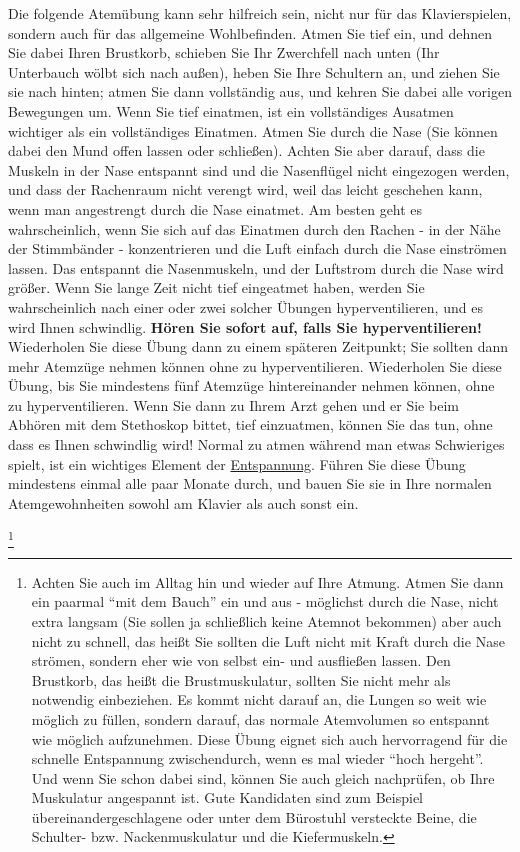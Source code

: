 Die folgende Atemübung kann sehr hilfreich sein, nicht nur für das Klavierspielen, sondern auch für das allgemeine Wohlbefinden.
Atmen Sie tief ein, und dehnen Sie dabei Ihren Brustkorb, schieben Sie Ihr Zwerchfell nach unten (Ihr Unterbauch wölbt sich nach außen), heben Sie Ihre Schultern an, und ziehen Sie sie nach hinten; atmen Sie dann vollständig aus, und kehren Sie dabei alle vorigen Bewegungen um.
Wenn Sie tief einatmen, ist ein vollständiges Ausatmen wichtiger als ein vollständiges Einatmen.
Atmen Sie durch die Nase (Sie können dabei den Mund offen lassen oder schließen). Achten Sie aber darauf, dass die Muskeln in der Nase entspannt sind und die Nasenflügel nicht eingezogen werden, und dass der Rachenraum nicht verengt wird, weil das leicht geschehen kann, wenn man angestrengt durch die Nase einatmet. Am besten geht es wahrscheinlich, wenn Sie sich auf das Einatmen durch den Rachen - in der Nähe der Stimmbänder - konzentrieren und die Luft einfach durch die Nase einströmen lassen. Das entspannt die Nasenmuskeln, und der Luftstrom durch die Nase wird größer.
Wenn Sie lange Zeit nicht tief eingeatmet haben, werden Sie wahrscheinlich nach einer oder zwei solcher Übungen hyperventilieren, und es wird Ihnen schwindlig. \textbf{Hören Sie sofort auf, falls Sie hyperventilieren!}
Wiederholen Sie diese Übung dann zu einem späteren Zeitpunkt; Sie sollten dann mehr Atemzüge nehmen können ohne zu hyperventilieren.
Wiederholen Sie diese Übung, bis Sie mindestens fünf Atemzüge hintereinander nehmen können, ohne zu hyperventilieren.
Wenn Sie dann zu Ihrem Arzt gehen und er Sie beim Abhören mit dem Stethoskop bittet, tief einzuatmen, können Sie das tun, ohne dass es Ihnen schwindlig wird!
Normal zu atmen während man etwas Schwieriges spielt, ist ein wichtiges Element der \hyperlink{c1ii14}{Entspannung}.
Führen Sie diese Übung mindestens einmal alle paar Monate durch, und bauen Sie sie in Ihre normalen Atemgewohnheiten sowohl am Klavier als auch sonst ein.

\hypertarget{c1ii21uebung}{}\footnote{Achten Sie auch im Alltag hin und wieder auf Ihre Atmung. Atmen Sie dann ein paarmal \enquote{mit dem Bauch} ein und aus - möglichst durch die Nase, nicht extra langsam (Sie sollen ja schließlich keine Atemnot bekommen) aber auch nicht zu schnell, das heißt Sie sollten die Luft nicht mit Kraft durch die Nase strömen, sondern eher wie von selbst ein- und ausfließen lassen. Den Brustkorb, das heißt die Brustmuskulatur, sollten Sie nicht mehr als notwendig einbeziehen. Es kommt nicht darauf an, die Lungen so weit wie möglich zu füllen, sondern darauf, das normale Atemvolumen so entspannt wie möglich aufzunehmen. Diese Übung eignet sich auch hervorragend für die schnelle Entspannung zwischendurch, wenn es mal wieder \enquote{hoch hergeht}. Und wenn Sie schon dabei sind, können Sie auch gleich nachprüfen, ob Ihre Muskulatur angespannt ist. Gute Kandidaten sind zum Beispiel übereinandergeschlagene oder unter dem Bürostuhl versteckte Beine, die Schulter- bzw. Nackenmuskulatur und die Kiefermuskeln.}

